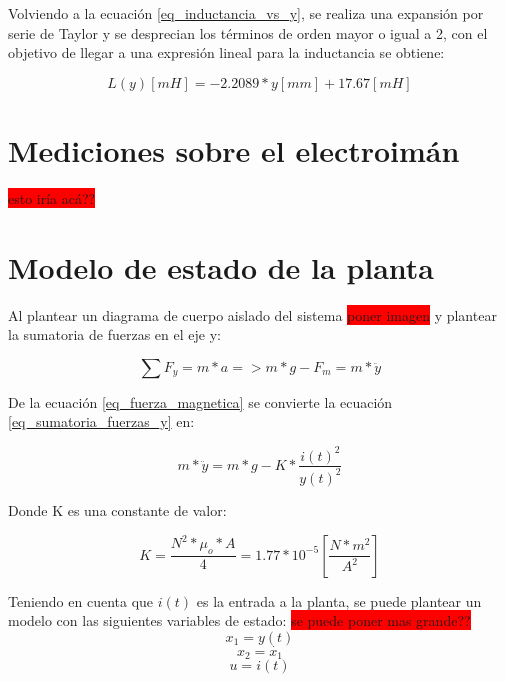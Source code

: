 \noindent Volviendo a la ecuación \ref{eq_inductancia_vs_y}, se realiza una expansión por serie de Taylor y se desprecian los términos de orden mayor o igual a 2, con el objetivo de llegar a una expresión lineal para la inductancia se obtiene:

\begin{equation} \label{eq_inductancia_lineal_teorica}
	L(y)[mH]=-2.2089*y[mm]+17.67 [mH]
\end{equation}

\section{Mediciones sobre el electroimán}

\colorbox{red}{esto iría acá??}

\section{Modelo de estado de la planta}

\noindent Al plantear un diagrama de cuerpo aislado del sistema \colorbox{red}{poner imagen} y plantear la sumatoria de fuerzas en el eje y:

\begin{equation}\label{eq_sumatoria_fuerzas_y}
	\sum F_{y}=m*a=>m*g-F_{m}=m*\ddot{y}
\end{equation}

\noindent De la ecuación \ref{eq_fuerza_magnetica} se convierte la ecuación \ref{eq_sumatoria_fuerzas_y} en:

\begin{equation}\label{eq_sumatoria_fuerzas_y_2}
	m*\ddot{y}=m*g-K*\frac{i(t)^{2}}{y(t)^{2}}
\end{equation}

\noindent Donde K es una constante de valor:

\begin{equation}
	K=\frac{N^{2}*\mu_{o}*A}{4}=1.77*10^{-5} [\frac{N*m^2}{A^2}]
\end{equation}

\noindent Teniendo en cuenta que $i(t)$ es la entrada a la planta, se puede plantear un modelo con las siguientes variables de estado:\newline
\colorbox{red}{se puede poner mas grande??}
\begin{equation}
	x_{1}=y(t)
\end{equation}
\begin{equation}
	x_{2}=\dot{x_{1}}
\end{equation}
\begin{equation}
	u=i(t)
\end{equation}

